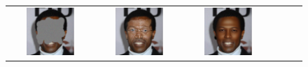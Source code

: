 \documentclass{article} %
\theoremstyle{definition}
\begin{document}
\begin{figure}[htp]
\begin{adjustbox}{max width=1.0\textwidth}
\begin{tabular}{cccccc}
\includegraphics[width=0.6\textwidth]{figures/celebahq/paintbrush_inpainting_noisy_batch3_im0_pnsr15.90.pdf} &
\includegraphics[width=0.6\textwidth]{figures/celebahq/paintbrush_inpainting_ot_ode_batch3_im0_iterfinal_pnsr19.83.pdf} & 
\includegraphics[width=0.6\textwidth]{figures/celebahq/paintbrush_inpainting_flow_priors_batch3_im0_iterfinal_pnsr25.61.pdf} & 

\end{tabular}
\end{adjustbox}
\end{figure}
\end{document}
